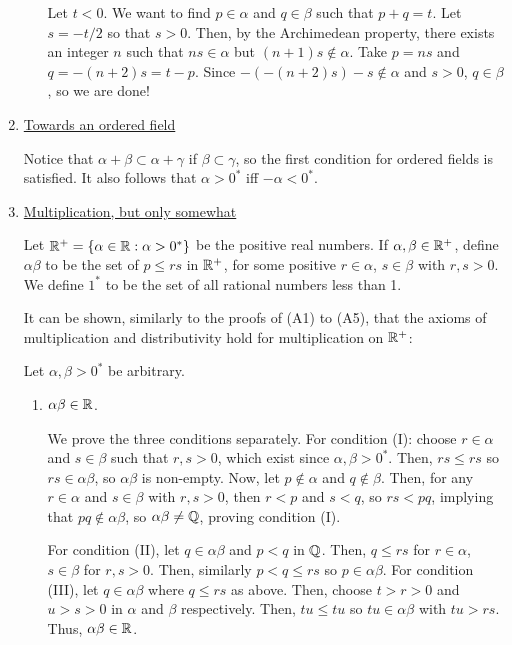 \begin{enumerate}[Step 1.]
\begin{enumerate}[({A}1)]
Let $t < 0$. We want to find $p \in \alpha$ and $q \in \beta$ such that $p + q = t$. Let $s = -t/2$ so that $s > 0$. Then, by the Archimedean property, there exists an integer $n$ such that $ns \in \alpha$ but $(n + 1)s \not\in \alpha$. Take $p = ns$ and $q = -(n + 2)s = t - p$. Since $-(-(n + 2)s) - s \not\in \alpha$ and $s > 0$, $q \in \beta$, so we are done!

\end{enumerate}

\item \underline{Towards an ordered field}

Notice that $\alpha + \beta \subset \alpha + \gamma$ if $\beta \subset \gamma$, so the first condition for ordered fields is satisfied. It also follows that $\alpha > 0^*$ iff $-\alpha < 0^*$. 

\item \underline{Multiplication, but only somewhat}

Let $\mathbb{R}^+ = \{\alpha \in \mathbb{R} : \alpha > 0^*\}$ be the positive real numbers. If $\alpha, \beta \in \mathbb{R}^+$, define $\alpha\beta$ to be the set of $p \le rs$ in $\mathbb{R}^+$, for some positive $r \in \alpha$, $s \in \beta$ with $r, s > 0$. We define $1^*$ to be the set of all rational numbers less than 1.

It can be shown, similarly to the proofs of (A1) to (A5), that the axioms of multiplication and distributivity hold for multiplication on $\mathbb{R}^+$:

Let $\alpha, \beta > 0^*$ be arbitrary.
\begin{enumerate}[({M}1)]
\item $\alpha \beta \in \mathbb{R}$.

We prove the three conditions separately. For condition (I): choose $r \in \alpha$ and $s \in \beta$ such that $r, s > 0$, which exist since $\alpha, \beta > 0^*$. Then, $rs \le rs$ so $rs \in \alpha\beta$, so $\alpha\beta$ is non-empty. Now, let $p \not\in \alpha$ and $q \not\in \beta$. Then, for any $r \in \alpha$ and $s \in \beta$ with $r, s > 0$, then $r < p$ and $s < q$, so $rs < pq$, implying that $pq \not\in \alpha\beta$, so $\alpha\beta \ne \mathbb{Q}$, proving condition (I).

For condition (II), let $q \in \alpha\beta$ and $p < q$ in $\mathbb{Q}$. Then, $q \le rs$ for $r \in \alpha$, $s \in \beta$ for $r, s > 0$. Then, similarly $p < q \le rs$ so $p \in \alpha\beta$. For condition (III), let $q \in \alpha\beta$ where $q \le rs$ as above. Then, choose $t > r > 0$ and $u > s > 0$ in $\alpha$ and $\beta$ respectively. Then, $tu \le tu$ so $tu \in \alpha\beta$ with $tu > rs$. Thus, $\alpha\beta \in \mathbb{R}$.


\end{enumerate}
\end{enumerate}
